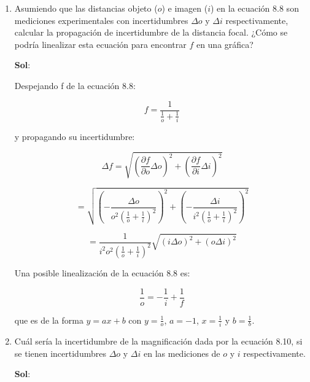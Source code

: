 \documentclass[12pt,a4paper]{article}
\begin{document}
\begin{enumerate}



\item Asumiendo que las distancias objeto ($o$) e imagen ($i$) en la ecuación 8.8 son mediciones experimentales con incertidumbres $\Delta o$ y $\Delta i$ respectivamente, calcular la propagación de incertidumbre de la distancia focal. ¿Cómo se podría linealizar esta ecuación para encontrar $f$ en una gráfica?

\textbf{Sol}:

Despejando f de la ecuación 8.8:

\begin{equation*}
    f = \frac{1}{\frac{1}{o}+\frac{1}{i}}
\end{equation*}

y propagando su incertidumbre:

\begin{equation*}
    \Delta f =\sqrt{\left(\frac{\partial f}{\partial o} \Delta o \right)^{2} + \left(\frac{\partial f}{\partial i} \Delta i \right)^{2}}
\end{equation*}

\begin{equation*}
    = \sqrt{\left(-\frac{\Delta o}{o^2(\frac{1}{o}+\frac{1}{i})^2}\right)^{2}+\left(-\frac{\Delta i}{i^2 (\frac{1}{o}+\frac{1}{i})^2}\right)^{2}}
\end{equation*}

\begin{equation*}
    = \frac{1}{i^2 o^2(\frac{1}{o}+\frac{1}{i})^2} \sqrt{(i\Delta o)^2 + (o \Delta i)^2}
\end{equation*}

Una posible linealización de la ecuación 8.8 es:

\begin{equation*}
    \frac{1}{o} = -\frac{1}{i} + \frac{1}{f}
\end{equation*}

que es de la forma $y= ax+b$ con $y= \frac{1}{o}$, $a = -1$, $x= \frac{1}{i}$ y $b = \frac{1}{b}$.







\item Cuál sería la incertidumbre de la magnificación dada por la ecuación 8.10, si se tienen incertidumbres $\Delta o$ y $\Delta i$ en las mediciones de $o$ y $i$ respectivamente.

\textbf{Sol}:


\end{enumerate}
\end{document}
